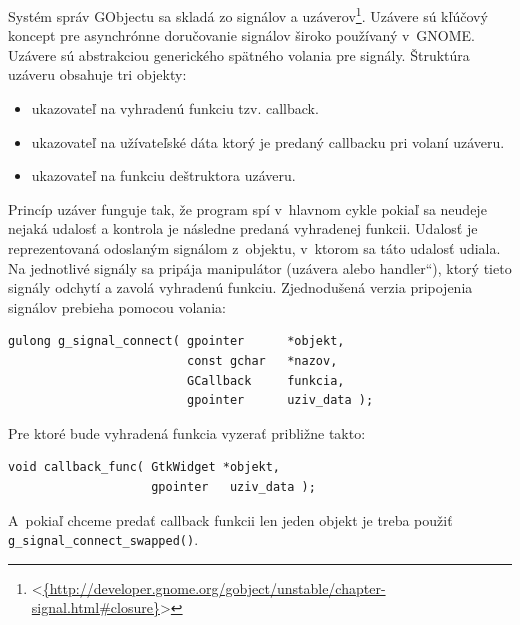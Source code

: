 \documentclass[12pt,oneside,final]{fithesis2}
\newcommand\uv[1]{\quotedblbase #1\textquotedblleft}%
\begin{document}
Systém správ GObjectu sa skladá zo signálov a uzáverov\footnote{<\url{{http://developer.gnome.org/gobject/unstable/chapter-signal.html\#closure}}>}. Uzávere sú kľúčový koncept pre asynchrónne doručovanie signálov široko používaný v~GNOME. Uzávere sú abstrakciou generického spätného volania pre signály. Štruktúra uzáveru obsahuje tri objekty:
\begin{itemize}
\item ukazovateľ na vyhradenú funkciu tzv. callback.
\item ukazovateľ na užívateľské dáta ktorý je predaný callbacku pri volaní uzáveru.
\item ukazovateľ na funkciu deštruktora uzáveru.
\end{itemize}
Princíp uzáver funguje tak, že program spí v~hlavnom cykle pokiaľ sa neudeje nejaká udalosť a kontrola je následne predaná vyhradenej funkcii. Udalosť je reprezentovaná odoslaným signálom z~objektu, v~ktorom sa táto udalosť udiala. Na jednotlivé signály sa pripája manipulátor (uzávera alebo \uv{handler}), ktorý tieto signály odchytí a zavolá vyhradenú funkciu. Zjednodušená verzia pripojenia signálov prebieha pomocou volania:
\begin{verbatim}
gulong g_signal_connect( gpointer      *objekt,
                         const gchar   *nazov,
                         GCallback     funkcia,
                         gpointer      uziv_data );
\end{verbatim} Pre ktoré bude vyhradená funkcia vyzerať približne takto: 
\begin{verbatim}
void callback_func( GtkWidget *objekt,
                    gpointer   uziv_data );
\end{verbatim}
A~pokiaľ chceme predať callback funkcii len jeden objekt je treba použiť \texttt{g\_signal\_connect\_swapped()}.
\end{document}
